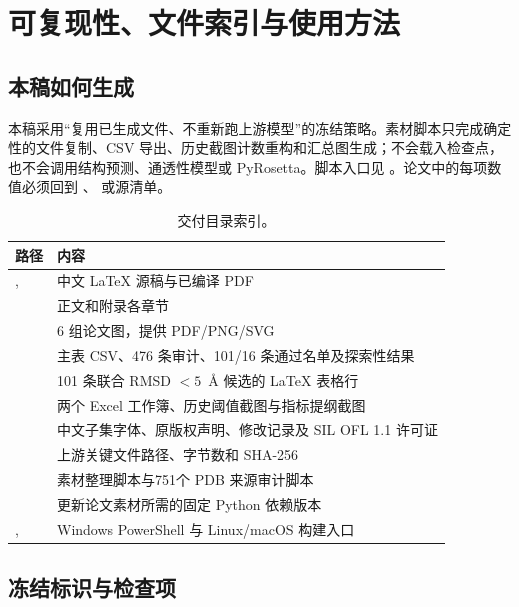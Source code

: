 \section{可复现性、文件索引与使用方法}
\label{app:reproducibility}

\subsection{本稿如何生成}

本稿采用“复用已生成文件、不重新跑上游模型”的冻结策略。素材脚本只完成确定性的文件复制、CSV 导出、历史截图计数重构和汇总图生成；不会载入检查点，也不会调用结构预测、通透性模型或 PyRosetta。脚本入口见 。论文中的每项数值必须回到 、 或源清单。

\begin{table}[H]
\centering
\caption{交付目录索引。}
\label{tab:file-index}
\begin{tabularx}{\textwidth}{L{39mm}Y}
\toprule
路径 & 内容 \\
\midrule
{},  & 中文 LaTeX 源稿与已编译 PDF \\
 & 正文和附录各章节 \\
 & 6 组论文图，提供 PDF/PNG/SVG \\
 & 主表 CSV、476 条审计、101/16 条通过名单及探索性结果 \\
 & 101 条联合 RMSD $<5$~\AA{} 候选的 LaTeX 表格行 \\
 & 两个 Excel 工作簿、历史阈值截图与指标提纲截图 \\
 & 中文子集字体、原版权声明、修改记录及 SIL OFL 1.1 许可证 \\
 & 上游关键文件路径、字节数和 SHA-256 \\
 & 素材整理脚本与751个 PDB 来源审计脚本 \\
 & 更新论文素材所需的固定 Python 依赖版本 \\
,  & Windows PowerShell 与 Linux/macOS 构建入口 \\
\bottomrule
\end{tabularx}
\end{table}

\subsection{冻结标识与检查项}

